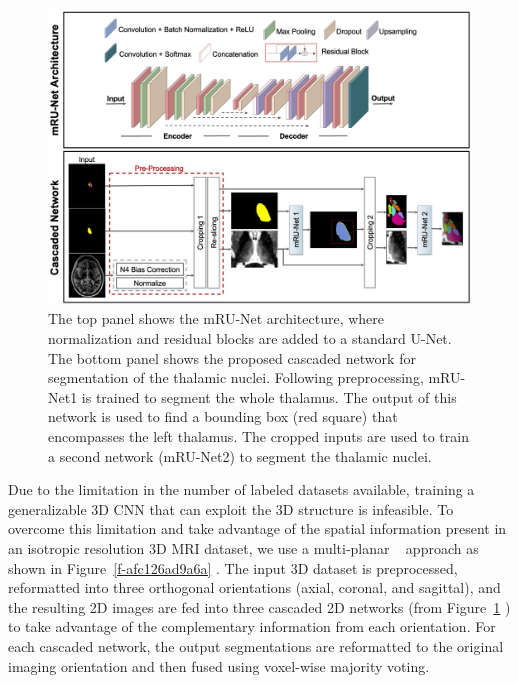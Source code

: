 \begin{figure}[!htbp]
\centering 
\includegraphics[width=\textwidth]{Thalamus/images/slide1.jpeg}
\caption{The top panel shows the mRU-Net architecture, where normalization and residual blocks are added to a standard U-Net. The bottom panel shows the proposed cascaded network for segmentation of the thalamic nuclei. Following preprocessing, mRU-Net1 is trained to segment the whole thalamus. The output of this network is used to find a bounding box (red square) that encompasses the left thalamus. The cropped inputs are used to train a second network (mRU-Net2) to segment the thalamic nuclei. }
\label{f-49677889c7e1}
\end{figure}



Due to the limitation in the number of labeled datasets available, training a generalizable 3D CNN that can exploit the 3D structure is infeasible. To overcome this limitation and take advantage of the spatial information present in an isotropic resolution 3D MRI dataset, we use a multi-planar \unskip~\cite{1643371:26789950} approach as shown in Figure~\ref{f-afc126ad9a6a} . The input 3D dataset is preprocessed, reformatted into three orthogonal orientations (axial, coronal, and sagittal), and the resulting 2D images are fed into three cascaded 2D networks (from Figure~\ref{f-49677889c7e1} ) to take advantage of the complementary information from each orientation. For each cascaded network, the output segmentations are reformatted to the original imaging orientation and then fused using voxel-wise majority voting.


